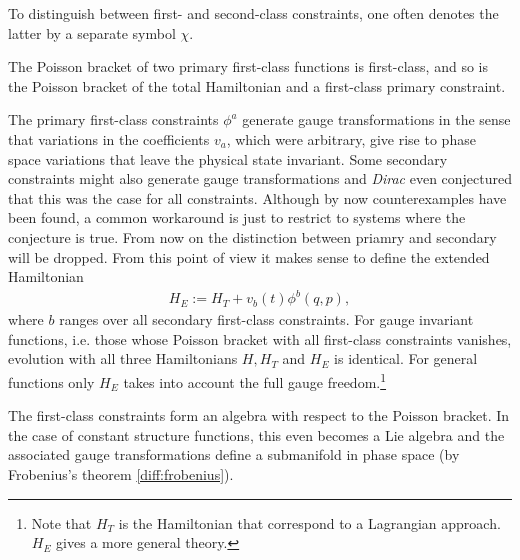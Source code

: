     \begin{notation}
        To distinguish between first- and second-class constraints, one often denotes the latter by a separate symbol $\chi$.
    \end{notation}
    \begin{property}
        The Poisson bracket of two primary first-class functions is first-class, and so is the Poisson bracket of the total Hamiltonian and a first-class primary constraint.
    \end{property}

    \begin{remark}
        The primary first-class constraints $\phi^a$ generate gauge transformations in the sense that variations in the coefficients $v_a$, which were arbitrary, give rise to phase space variations that leave the physical state invariant. Some secondary constraints might also generate gauge transformations and \textit{Dirac} even conjectured that this was the case for all constraints. Although by now counterexamples have been found, a common workaround is just to restrict to systems where the conjecture is true. From now on the distinction between priamry and secondary will be dropped. From this point of view it makes sense to define the extended Hamiltonian
        \begin{gather}
            H_E := H_T + v_b(t)\phi^b(q,p),
        \end{gather}
        where $b$ ranges over all secondary first-class constraints. For gauge invariant functions, i.e. those whose Poisson bracket with all first-class constraints vanishes, evolution with all three Hamiltonians $H,H_T$ and $H_E$ is identical. For general functions only $H_E$ takes into account the full gauge freedom.\footnote{Note that $H_T$ is the Hamiltonian that correspond to a Lagrangian approach. $H_E$ gives a more general theory.}
    \end{remark}
    \begin{result}
        The first-class constraints form an algebra with respect to the Poisson bracket. In the case of constant structure functions, this even becomes a Lie algebra and the associated gauge transformations define a submanifold in phase space (by Frobenius's theorem \ref{diff:frobenius}).
    \end{result}

